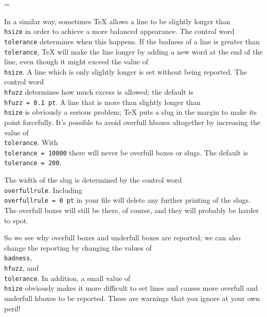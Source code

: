 \headline={\iftitlepage \hfil \global\titlepagefalse 
                                      \else \gentleheadline \fi} 
 
In a similar way, sometimes \TeX{} allows a line to be slightly 
longer than {\tt \\hsize} in order to achieve a more balanced 
appearance. The control word {\tt \\tolerance} determines when 
this happens.  If the badness of a line is greater than {\tt 
\\tolerance}, \TeX{} will make the line longer by adding a new word 
at the end of the line, even though it might exceed the value of 
{\tt \\hsize}. A line which is only slightly longer is set 
without being reported. The control word {\tt \\hfuzz} determines 
how much excess is allowed; the default is {\tt \\hfuzz 
=~0.1~pt}.  A line that is more than slightly longer than {\tt \\hsize} 
is obviously a serious problem; \TeX{} puts a slug in 
the margin to make its point forcefully. It's possible to avoid 
overfull hboxes altogether by increasing the value of {\tt \\tolerance}. 
With {\tt \\tolerance = 10000} there will never be 
overfull boxes or slugs. The default is {\tt \\tolerance = 200}\null. 
 
The width of the slug is determined by the control word {\tt 
\\overfullrule}.  Including {\tt \\overfullrule = 0 pt} in your 
file will delete any further  printing of the slugs.  The 
overfull boxes will still be there, of course, and they will 
probably be harder to spot. 
 
So we see why overfull boxes and underfull boxes are reported; we 
can also change the reporting by changing the values of {\tt 
\\badness}, {\tt \\hfuzz}, and {\tt \\tolerance}.  In addition, a 
small value of {\tt \\hsize} obviously makes it more difficult to 
set lines and causes more overfull and underfull hboxes to be 
reported. These are warnings that you ignore at your own peril! 
 
